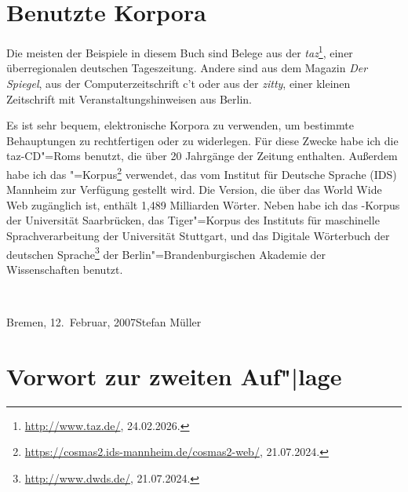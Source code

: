 \section*{Benutzte Korpora}

Die meisten der Beispiele in diesem Buch sind Belege aus der {\em taz}\footnote{
\url{http://www.taz.de/}, 24.02.2026.}, einer überregionalen
deutschen Tageszeitung. Andere sind aus dem Magazin \emph{Der Spiegel},
aus der Computerzeitschrift c't oder aus der \emph{zitty}, einer kleinen Zeitschrift mit
Veranstaltungshinweisen aus Berlin. 


Es ist sehr bequem, elektronische Korpora zu verwenden, um bestimmte Behauptungen zu rechtfertigen
oder zu widerlegen.
Für diese Zwecke habe ich die taz-CD"=Roms benutzt, die über 20 Jahrgänge der Zeitung enthalten.
Außerdem habe ich das \cosmas"=Korpus\footnote{\url{https://cosmas2.ids-mannheim.de/cosmas2-web/}, 21.07.2024.} 
verwendet, das vom Institut für Deutsche Sprache (IDS) Mannheim zur Verfügung gestellt
wird. Die Version, die über das World Wide Web zugänglich ist, enthält 1,489 Milliarden Wörter.
Neben \cosmas habe ich das \negra{}\hyp Korpus der Universität Saarbrücken,
das Tiger"=Korpus des Instituts für maschinelle Sprachverarbeitung der Universität Stuttgart,
und das Digitale Wörterbuch der deutschen Sprache\footnote{\url{http://www.dwds.de/}, 21.07.2024.} der 
Berlin"=Brandenburgischen Akademie der Wissenschaften benutzt.

~\medskip

\noindent
Bremen, 12.\ Februar, 2007\hfill Stefan Müller

\section*{Vorwort zur zweiten Auf"|lage}

